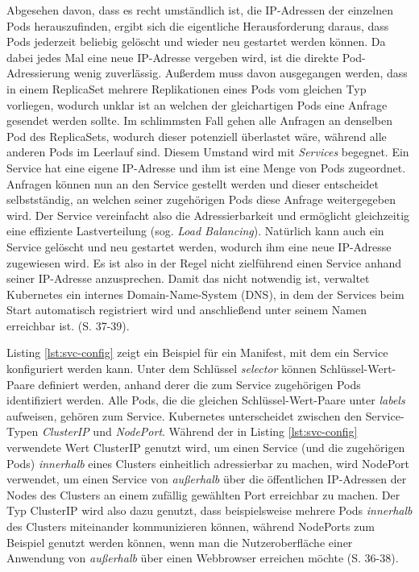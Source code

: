 \documentclass[11pt,a4paper]{article}
\begin{document}
Abgesehen davon, dass es recht umständlich ist, die IP-Adressen der einzelnen Pods herauszufinden,
ergibt sich die eigentliche Herausforderung daraus, dass Pods jederzeit beliebig gelöscht
und wieder neu gestartet werden können. Da dabei jedes Mal eine neue IP-Adresse vergeben wird,
ist die direkte Pod-Adressierung wenig zuverlässig. Außerdem muss davon ausgegangen werden, dass
in einem ReplicaSet mehrere Replikationen eines Pods vom gleichen Typ vorliegen, wodurch unklar ist
an welchen der gleichartigen Pods eine Anfrage gesendet werden sollte. Im schlimmsten Fall gehen alle Anfragen
an denselben Pod des ReplicaSets, wodurch dieser potenziell überlastet wäre, während alle anderen Pods im Leerlauf sind.
Diesem Umstand wird mit \emph{Services} begegnet. Ein Service hat eine eigene IP-Adresse und ihm ist eine Menge
von Pods zugeordnet. Anfragen können nun an den Service gestellt werden und dieser entscheidet selbstständig,
an welchen seiner zugehörigen Pods diese Anfrage weitergegeben wird. Der Service vereinfacht also die
Adressierbarkeit und ermöglicht gleichzeitig eine effiziente Lastverteilung (sog. \emph{Load Balancing}).
Natürlich kann auch ein Service gelöscht und neu gestartet werden, wodurch ihm eine neue IP-Adresse zugewiesen wird.
Es ist also in der Regel nicht zielführend einen Service anhand seiner IP-Adresse anzusprechen.
Damit das nicht notwendig ist, verwaltet Kubernetes ein internes Domain-Name-System (DNS), in dem
der Services beim Start automatisch registriert wird und anschließend unter seinem Namen
erreichbar ist. \cite{Schmeling_Dargatz_2022} (S. 37-39).

Listing \ref{lst:svc-config} zeigt ein Beispiel für ein Manifest,
mit dem ein Service konfiguriert werden kann.
Unter dem Schlüssel \emph{selector} können Schlüssel-Wert-Paare definiert werden,
anhand derer die zum Service zugehörigen Pods identifiziert werden. Alle Pods, die
die gleichen Schlüssel-Wert-Paare unter \emph{labels} aufweisen, gehören zum Service.
Kubernetes unterscheidet zwischen den Service-Typen \emph{ClusterIP} und \emph{NodePort}.
Während der in Listing \ref{lst:svc-config} verwendete Wert ClusterIP genutzt wird, um einen Service
(und die zugehörigen Pods) \emph{innerhalb} eines Clusters
einheitlich adressierbar zu machen, wird NodePort verwendet, um einen Service von \emph{außerhalb}
über die öffentlichen IP-Adressen der Nodes des Clusters
an einem zufällig gewählten Port erreichbar zu machen.
Der Typ ClusterIP wird also dazu genutzt, dass beispielsweise mehrere Pods \emph{innerhalb}
des Clusters miteinander kommunizieren können, während NodePorts zum Beispiel genutzt werden können,
wenn man die Nutzeroberfläche einer Anwendung von \emph{außerhalb}
über einen Webbrowser erreichen möchte \cite{Schmeling_Dargatz_2022} (S. 36-38).

\end{document}
